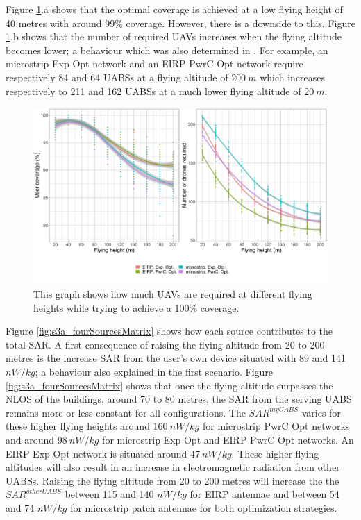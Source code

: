 \documentclass[twocolumn]{phdsymp} %
\begin{document}
Figure \ref{fig:s3a_numDronesAndCov}.a shows that the optimal coverage is achieved at a low flying height of 
40 metres with around 99\% coverage. 
However, there is a downside to this. 
Figure \ref{fig:s3a_numDronesAndCov}.b 
 shows that the number of required \gls{UAV}s increases when the flying altitude becomes lower;
a behaviour which was also determined in \cite{J2}.
For example, an microstrip \gls{Exp Opt} network and an \gls{EIRP} \gls{PwrC Opt} network require respectively 84 and 64
\gls{UABS}s at a flying altitude of $200\ m$ which increases respectively to 211 and 162 \gls{UABS}s at a much lower flying altitude of $20\ m$.

\begin{figure}[]
  \includegraphics[width=\linewidth]{../results/s3/fhvsnumdronesAndCov.png}
  \caption{This graph shows how much \acs{UAV}s are required at different flying heights while trying to achieve a 100\% coverage.}
  \label{fig:s3a_numDronesAndCov}
\end{figure}

Figure \ref{fig:s3a_fourSourcesMatrix} shows how each source contributes to the total \gls{SAR}.
A first consequence of raising the flying altitude from 
 20 to 200 metres is the increase \gls{SAR} from the user's own device situated
 with 89 and 141 $nW/kg$; a behaviour also explained in the first scenario.
Figure \ref{fig:s3a_fourSourcesMatrix} shows that once the flying altitude surpasses the \gls{NLOS} of the buildings, 
around 70 to 80 metres, the SAR from the serving \gls{UABS} remains 
more or less constant for all configurations.
The $SAR^{myUABS}$ varies for these higher flying heights 
around $160\ nW/kg$ for microstrip \gls{PwrC Opt} networks and around $98\ nW/kg$ for microstrip \gls{Exp Opt} and \gls{EIRP} \gls{PwrC Opt} networks.
An \gls{EIRP} \gls{Exp Opt} network is situated around $47\ nW/kg$.
These higher flying altitudes will also result in an increase in electromagnetic radiation from 
other \gls{UABS}s.
Raising the flying altitude from 20 to 200 metres will increase the
the $SAR^{otherUABS}$ between 115 and 140 $nW/kg$ for \gls{EIRP} antennae and between 54 and 74 $nW/kg$ for microstrip patch antennae
for both optimization strategies.
\end{document}
